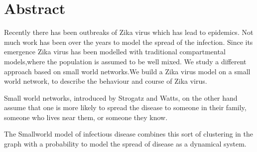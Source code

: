 
\chapter*{Abstract} 
Recently there has been outbreaks of Zika virus which has
lead to epidemics. Not much work has been
over the years to model the spread of the
infection.
Since its emergence Zika virus has been modelled with traditional compartmental models,where
the population is assumed to be well mixed.
We study a different approach based on small world networks.We
build a Zika virus model on a small world network, to describe the behaviour and course of Zika virus.


Small world networks, introduced by Strogatz and Watts, on the other hand
assume that one is more likely to spread the disease to someone in their family, someone who lives near them, or someone they know.

The Smallworld
model of infectious disease combines this sort of clustering in the graph with a probability
to model the spread of disease as a dynamical system.





